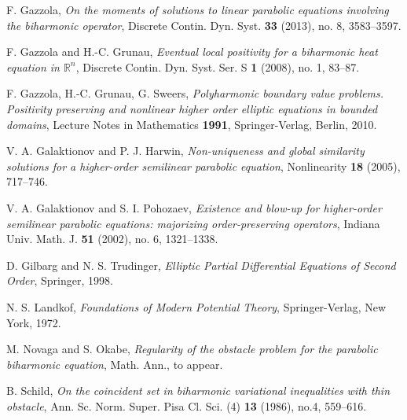 \documentclass[12pt]{amsart}
\begin{document}
\begin{thebibliography}{99}
  F. Gazzola, 
{\it On the moments of solutions to linear parabolic equations involving the biharmonic operator}, 
Discrete Contin. Dyn. Syst. {\bf 33} (2013), no. 8, 3583--3597. 

  F. Gazzola and H.-C. Grunau, 
{\it Eventual local positivity for a biharmonic heat equation in ${\mathbb{R}}^n$}, 
Discrete Contin. Dyn. Syst. Ser. S {\bf 1} (2008), no. 1, 83--87. 

 F. Gazzola, H.-C. Grunau, G. Sweers, 
{\it Polyharmonic boundary value problems. Positivity preserving and nonlinear higher order elliptic equations in bounded domains}, 
Lecture Notes in Mathematics {\bf 1991}, Springer-Verlag, Berlin, 2010.

  V. A. Galaktionov and P. J. Harwin, 
{\it Non-uniqueness and global similarity solutions for a higher-order semilinear parabolic equation}, 
Nonlinearity {\bf 18} (2005), 717--746.

  V. A. Galaktionov and S. I. Pohozaev, 
{\it Existence and blow-up for higher-order semilinear parabolic equations: majorizing order-preserving operators}, 
Indiana Univ. Math. J. {\bf 51} (2002), no. 6, 1321--1338.

  D. Gilbarg and N. S. Trudinger, 
{\it Elliptic Partial Differential Equations of Second Order}, Springer, 1998. 

  N. S. Landkof, 
{\it Foundations of Modern Potential Theory}, Springer-Verlag, New York, 1972. 

 M. Novaga and S. Okabe, 
 {\it Regularity of the obstacle problem for the parabolic biharmonic equation}, Math. Ann., to appear. 

  B. Schild, {\it On the coincident set in biharmonic variational inequalities with thin obstacle}, 
Ann. Sc. Norm. Super. Pisa Cl. Sci. (4) {\bf 13} (1986), no.4, 559--616. 

\end{thebibliography}
\end{document}
